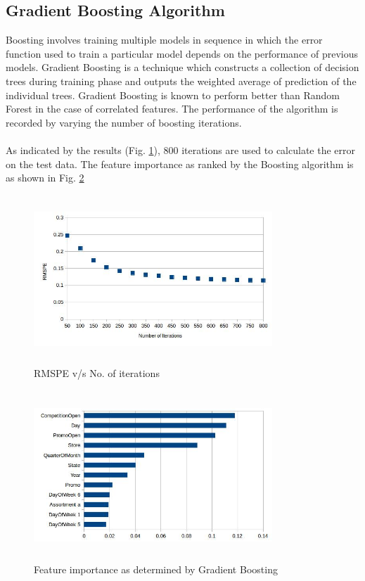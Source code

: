 \documentclass[12pt,a4paper]{article}
\begin{document}
\subsection{Gradient Boosting Algorithm}
\label{gb}
Boosting involves training multiple models in sequence in which the error function used to train a particular model depends on the performance of previous models.\cite{bishop} Gradient Boosting\cite{wiki_bo} is a technique which constructs a collection of decision trees during training phase and outputs the weighted average of prediction of the individual trees.
Gradient Boosting is known to perform better than Random Forest in the case of correlated features\cite{boost}. The performance of the algorithm is recorded by varying the number of boosting iterations.
\\
\\
As indicated by the results (Fig. \ref{fig:gbres}), 800 iterations are used to calculate the error on the test data. The feature importance as ranked by the Boosting algorithm is as shown in Fig. \ref{fig:gbimp}
\begin{figure}[H]
	\centering
	\includegraphics[width=0.8\textwidth,height=2.5in]{images/Boost_Error_Plot.jpg}
	\caption{RMSPE v/s No. of iterations}
	\label{fig:gbres}
\end{figure}

\begin{figure}[H]
	\centering
	\includegraphics[width=0.8\textwidth, height=2.5in]{images/Boost_Feature_Importance.jpg}
	\caption{Feature importance as determined by Gradient Boosting}
	\label{fig:gbimp}
\end{figure}
\end{document}
